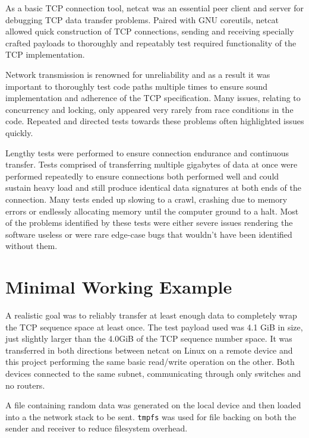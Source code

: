     As a basic TCP connection tool, netcat was an essential peer client and server for debugging TCP data transfer problems. Paired with GNU coreutils, netcat allowed quick construction of TCP connections, sending and receiving specially crafted payloads to thoroughly and repeatably test required functionality of the TCP implementation.

    Network transmission is renowned for unreliability and as a result it was important to thoroughly test code paths multiple times to ensure sound implementation and adherence of the TCP specification. Many issues, relating to concurrency and locking, only appeared very rarely from race conditions in the code. Repeated and directed tests towards these problems often highlighted issues quickly.

    Lengthy tests were performed to ensure connection endurance and continuous transfer. Tests comprised of transferring multiple gigabytes of data at once were performed repeatedly to ensure connections both performed well and could sustain heavy load and still produce identical data signatures at both ends of the connection. Many tests ended up slowing to a crawl, crashing due to memory errors or endlessly allocating memory until the computer ground to a halt. Most of the problems identified by these tests were either severe issues rendering the software useless or were rare edge-case bugs that wouldn't have been identified without them.

    \section{Minimal Working Example}\label{sec:test-working-example}
    A realistic goal was to reliably transfer at least enough data to completely wrap the TCP sequence space at least once.
    The test payload used was 4.1 GiB in size, just slightly larger than the 4.0GiB of the TCP sequence number space. It was transferred in both directions between netcat on Linux on a remote device and this project performing the same basic read/write operation on the other. Both devices connected to the same subnet, communicating through only switches and no routers.

    A file containing random data was generated on the local device and then loaded into a the network stack to be sent. \texttt{tmpfs} was used for file backing on both the sender and receiver to reduce filesystem overhead.


